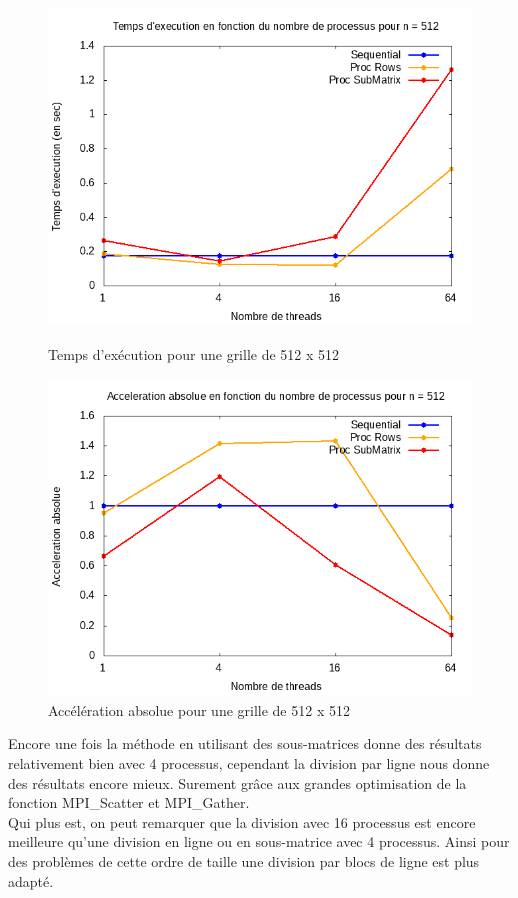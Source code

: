 \documentclass[10pt,a4paper]{article}
\begin{document}
\begin{figure}[h]
  \centering
  \begin{minipage}[b]{0.49\textwidth}
	\includegraphics[width=\textwidth]{./Time/size_512_time.png}
    \caption{Temps d'exécution pour une grille de 512 x 512}
  \end{minipage}
  \hfill
  \begin{minipage}[b]{0.49\textwidth}
    \includegraphics[width=\textwidth]{./Time/size_512_acceleration.png}
    \caption{Accélération absolue pour une grille de 512 x 512}
  \end{minipage}
\end{figure}
Encore une fois la méthode en utilisant des sous-matrices donne des résultats relativement bien avec 4 processus, cependant la division par ligne nous donne des résultats encore mieux. Surement grâce aux grandes optimisation de la fonction MPI\_Scatter et MPI\_Gather. \\
Qui plus est, on peut remarquer que la division avec 16 processus est encore meilleure qu'une division en ligne ou en sous-matrice avec 4 processus. Ainsi pour des problèmes de cette ordre de taille une division par blocs de ligne est plus adapté.
\end{document}
